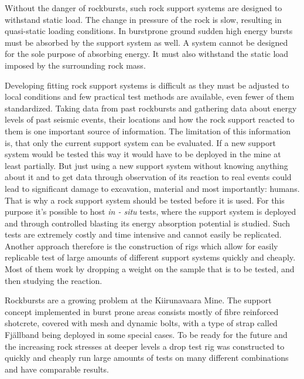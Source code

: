 Without the danger of rockbursts, such rock support systems are designed to withstand static load. The change in pressure of the rock is slow, resulting in quasi-static loading conditions. In burstprone ground  sudden high energy bursts must be absorbed by the support system as well. %
A system cannot be designed for the sole purpose of absorbing energy. It must also withstand the static load imposed by the surrounding rock mass. \autocite[233, 234]{Heal10} 

Developing fitting rock support systems is difficult as they must be adjusted to local conditions and few practical test methods are available, even fewer of them standardized. Taking data from past rockbursts and gathering data about energy levels of past seismic events, their locations and how the rock support reacted to them is one important source of information. The limitation of this information is, that only the current support system can be evaluated. If a new support system would be tested this way it would have to be deployed in the mine at least partially.
But just using a new support system without knowing anything about it and to get data through observation of its reaction to real events could lead to significant damage to excavation, material and most importantly: humans.
That is why a rock support system should be tested before it is used. For this purpose it's possible to host \textit{in - situ} tests, where the support system is deployed and through controlled blasting its energy absorption potential is studied. Such tests are extremely costly and time intensive and cannot easily be replicated. Another approach therefore is the construction of rigs which allow for easily replicable test of large amounts of different support systems quickly and cheaply. Most of them work by dropping a weight on the sample that is to be tested, and then studying the reaction.


Rockbursts are a growing problem at the Kiirunavaara Mine. The support concept implemented in burst prone areas consists mostly of fibre reinforced shotcrete, covered with mesh and dynamic bolts, with a type of strap called Fjällband being deployed in some special cases. 
To be ready for the future and the increasing rock stresses at deeper levels a drop test rig was constructed to quickly and cheaply run large amounts of tests on many different combinations and have comparable results.

